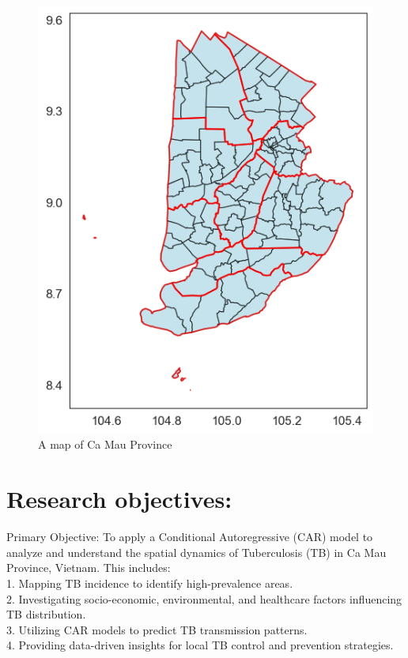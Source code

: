 \documentclass[
  number,
  preprint,
  3p]{elsarticle}
\begin{document}
\begin{figure}

{\centering \includegraphics{docs_files/figure-pdf/camap_map-output-1.png}

}

\caption{A map of Ca Mau Province}

\end{figure}

\hypertarget{research-objectives}{%
\section{Research objectives:}\label{research-objectives}}

Primary Objective: To apply a Conditional Autoregressive (CAR) model to
analyze and understand the spatial dynamics of Tuberculosis (TB) in Ca
Mau Province, Vietnam. This includes:\\
1. Mapping TB incidence to identify high-prevalence areas.\\
2. Investigating socio-economic, environmental, and healthcare factors
influencing TB distribution.\\
3. Utilizing CAR models to predict TB transmission patterns.\\
4. Providing data-driven insights for local TB control and prevention
strategies.
\end{document}
